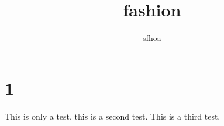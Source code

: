 \documentclass[]{article}
\title{fashion}
\author{sfhoa}
\begin{document}
\maketitle

\begin{abstract}

\end{abstract}

\section{1}
This is only a test.
this is a second test.
This is a third test.
\end{document}
